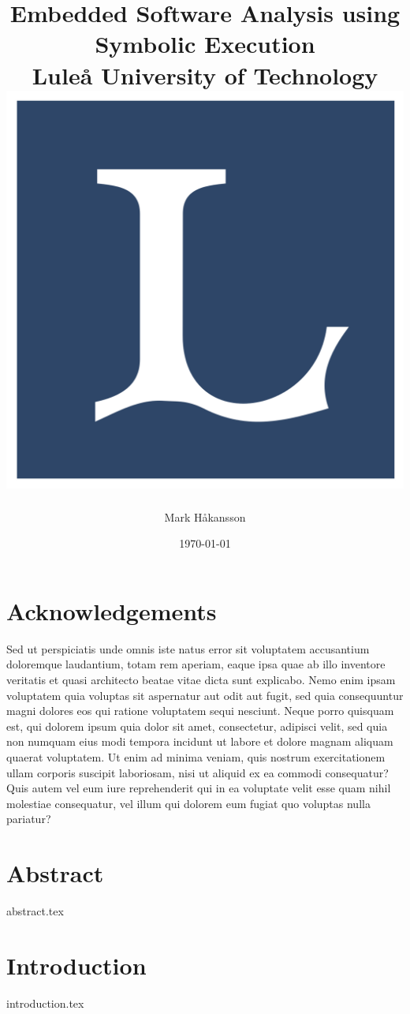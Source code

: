 \documentclass[twocolumn, a4paper]{report}
\title{
    {Embedded Software Analysis using Symbolic Execution}\\
    {\large Luleå University of Technology}\\
    {\includegraphics[scale=0.1]{ltulogo.png}}
}
\author{Mark Håkansson}
\date{\today}
\begin{document}
\maketitle


\onecolumn
\chapter*{Acknowledgements}
Sed ut perspiciatis unde omnis iste natus error sit voluptatem accusantium doloremque laudantium, totam rem aperiam, eaque ipsa quae ab illo inventore veritatis et quasi architecto beatae vitae dicta sunt explicabo. Nemo enim ipsam voluptatem quia voluptas sit aspernatur aut odit aut fugit, sed quia consequuntur magni dolores eos qui ratione voluptatem sequi nesciunt. Neque porro quisquam est, qui dolorem ipsum quia dolor sit amet, consectetur, adipisci velit, sed quia non numquam eius modi tempora incidunt ut labore et dolore magnam aliquam quaerat voluptatem. Ut enim ad minima veniam, quis nostrum exercitationem ullam corporis suscipit laboriosam, nisi ut aliquid ex ea commodi consequatur? Quis autem vel eum iure reprehenderit qui in ea voluptate velit esse quam nihil molestiae consequatur, vel illum qui dolorem eum fugiat quo voluptas nulla pariatur?

\onecolumn
\chapter*{Abstract}
{abstract.tex}

\tableofcontents




\twocolumn
\chapter{Introduction}
{introduction.tex}
\end{document}
